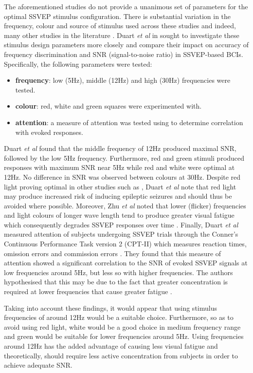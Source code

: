 The aforementioned studies do not provide a unanimous set of parameters for the optimal SSVEP stimulus configuration. There is substantial variation in the frequency, colour and source of stimulus used across these studies and indeed, many other studies in the literature \cite{duart-comparing-ssvep-stimuli}. Duart \textit{et al} in \cite{duart-comparing-ssvep-stimuli} sought to investigate these stimulus design parameters more closely and compare their impact on accuracy of frequency discrimination and SNR (signal-to-noise ratio) in SSVEP-based BCIs. Specifically, the following parameters were tested:
\begin{itemize}
    \item \textbf{frequency}: low (5Hz), middle (12Hz) and high (30Hz) frequencies were tested.
    \item \textbf{colour}: red, white and green squares were experimented with. 
    \item \textbf{attention}: a measure of attention was tested using to determine correlation with evoked responses.
\end{itemize}
Duart \textit{et al} found that the middle frequency of 12Hz produced maximal SNR, followed by the low 5Hz frequency. Furthermore, red and green stimuli produced responses with maximum SNR near 5Hz while red and white were optimal at 12Hz. No difference in SNR was observed between colours at 30Hz. Despite red light proving optimal in other studies such as \cite{chu-ssvep-colours}, Duart \textit{et al} note that red light may produce increased risk of inducing epileptic seizures and should thus be avoided where possible. Moreover, Zhu \textit{et al} noted that lower (flicker) frequencies and light colours of longer wave length tend to produce greater visual fatigue which consequently degrades SSVEP responses over time \cite{zhu2010survey}. Finally, Duart \textit{et al} measured attention of subjects undergoing SSVEP trials through the Conner's Continuous Performance Task version 2 (CPT-II) which measures reaction times, omission errors and commission errors \cite{duart-comparing-ssvep-stimuli}. They found that this measure of attention showed a significant correlation to the SNR of evoked SSVEP signals at low frequencies around 5Hz, but less so with higher frequencies. The authors hypothesised that this may be due to the fact that greater concentration is required at lower frequencies that cause greater fatigue \cite{duart-comparing-ssvep-stimuli}.

Taking into account these findings, it would appear that using stimulus frequencies of around 12Hz would be a suitable choice. Furthermore, so as to avoid using red light, white would be a good choice in medium frequency range and green would be suitable for lower frequencies around 5Hz. Using frequencies around 12Hz has the added advantage of causing less visual fatigue and theoretically, should require less active concentration from subjects in order to achieve adequate SNR.

